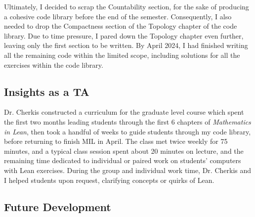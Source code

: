 Ultimately,
I decided to scrap the Countability section, for the sake of producing a 
cohesive code library before the end of the semester. Consequently, I also
needed to drop the Compactness section of the Topology chapter of
the code library. Due to time pressure, I pared down the Topology chapter
even further, leaving only the first section to be written. By April 2024, 
I had finished writing all the remaining code within the limited scope, 
including solutions for all the exercises within the code library.

\subsection{Insights as a TA}

Dr. Cherkis constructed a curriculum for the graduate level course 
which spent the first two months leading students through the first 6
chapters of \textit{Mathematics in Lean}, then took a handful of weeks to 
guide students through my code library, before returning to finish 
MIL in April. The class met twice weekly for 75 minutes, and a typical class
session spent about 20 minutes on lecture, and the remaining time dedicated
to individual or paired work on students' computers with Lean exercises. During
the group and individual work time, Dr. Cherkis and I helped students upon 
request, clarifying concepts or quirks of Lean.

\subsection{Future Development}
